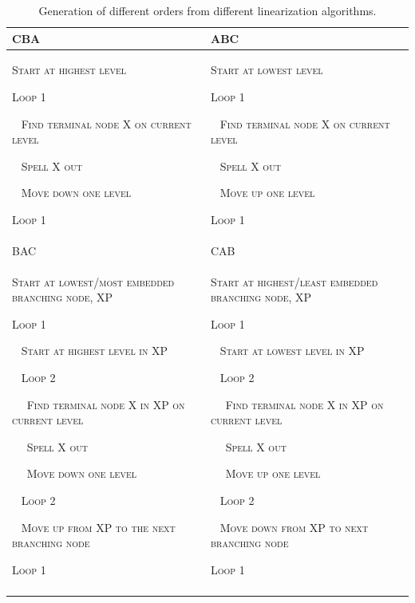   \begin{table}
\begin{tabularx}{\textwidth}{XX}
\lsptoprule
CBA & ABC\\
\midrule 
\textsc{Start at highest level}

\textsc{Loop 1}

~     \textsc{Find terminal node X on current level}

~    \textsc{Spell X out}

~     \textsc{Move down one level}

\textsc{Loop 1} & \textsc{Start at lowest level}

\textsc{Loop 1}

~     \textsc{Find terminal node X on current level}

~     \textsc{Spell X out}

~     \textsc{Move up one level}

\textsc{Loop 1}\\
\lsptoprule
BAC & CAB\\
\midrule
\textsc{Start at lowest}\textsc{/}\textsc{most embedded branching node, XP}

\textsc{Loop 1}

~      \textsc{Start at highest level in XP}

~      \textsc{Loop 2}

~~         \textsc{Find terminal node X in XP on current level}

~~         \textsc{Spell X out}

~~         \textsc{Move down one level}

~      \textsc{Loop 2}

~      \textsc{Move up from XP to the next branching node}

\textsc{Loop 1} & \textsc{Start at highest}\textsc{/}\textsc{least embedded branching node, XP}

\textsc{Loop 1}

~      \textsc{Start at lowest level in XP}

~      \textsc{Loop 2}

~~         \textsc{Find terminal node X in XP on current level}

~~         \textsc{Spell X out}

~~         \textsc{Move up one level}

~      \textsc{Loop 2}

~      \textsc{Move down from XP to next branching node}

\textsc{Loop 1}\\
\lspbottomrule
\end{tabularx}
\caption{Generation of different orders from different linearization algorithms.}\label{tab:3:1}
\end{table}

